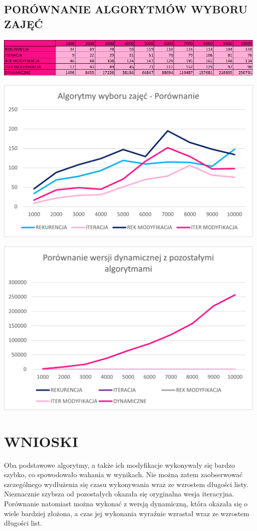 \documentclass{article}
\begin{document}
	\subsection*{PORÓWNANIE ALGORYTMÓW WYBORU ZAJĘĆ}
	\begin{center}
		\includegraphics[width = \textwidth]{Obraz5.png}
	\end{center}
	\begin{center}
		\includegraphics[width = \textwidth]{Obraz4.png}
	\end{center}
	\begin{center}
		\includegraphics[width = \textwidth]{Obraz1.png}
	\end{center}
	\section*{WNIOSKI}
	Oba podstawowe algorytmy, a także ich modyfikacje wykonywały się bardzo szybko, co spowodowało wahania w wynikach. Nie można zatem zaobserwować szczególnego wydłużenia się czasu wykonywania wraz ze wzrostem długości listy. Nieznacznie szybsza od pozostałych okazała się oryginalna wesja iteracyjna. Porównanie natomiast można wykonać z wersją dynamiczną, która okazała się o wiele bardziej złożona, a czas jej wykonania wyraźnie wzrastał wraz ze wzrostem długości list.
\end{document}
